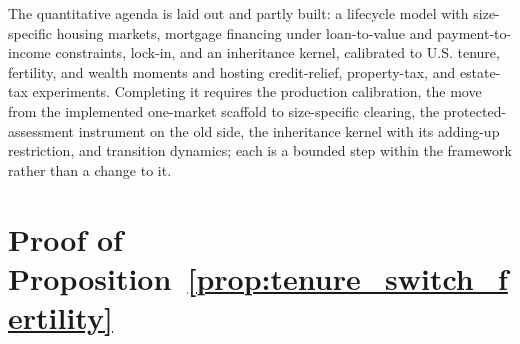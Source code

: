 \documentclass[11pt]{article}
\newcommand{\1}{\mathbf 1}
\begin{document}
The quantitative agenda is laid out and partly built: a lifecycle model with size-specific housing markets, mortgage financing under loan-to-value and payment-to-income constraints, lock-in, and an inheritance kernel, calibrated to U.S. tenure, fertility, and wealth moments and hosting credit-relief, property-tax, and estate-tax experiments. Completing it requires the production calibration, the move from the implemented one-market scaffold to size-specific clearing, the protected-assessment instrument on the old side, the inheritance kernel with its adding-up restriction, and transition dynamics; each is a bounded step within the framework rather than a change to it.

\appendix

\section{Proof of Proposition~\ref{prop:tenure_switch_fertility}}
\label{app:switchproof}
\end{document}
